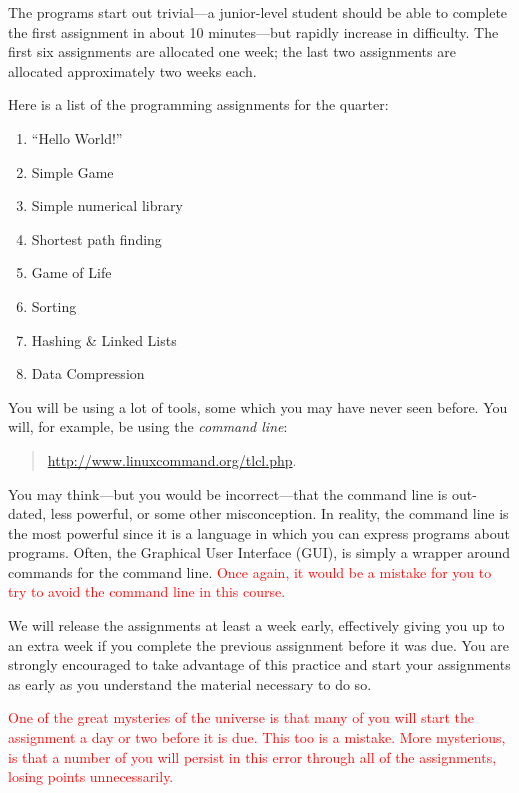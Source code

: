 \documentclass{article}
\begin{document}
The programs start out trivial---a junior-level student should be able to
complete the first assignment in about 10 minutes---but rapidly increase in
difficulty. The first six assignments are allocated one week; the last two
assignments are allocated approximately two weeks each.

Here is a list of the programming assignments for the quarter:
\begin{multicols}{2}
\begin{enumerate}[start=0]
  \item ``Hello World!''
  \item Simple Game
  \item Simple numerical library
  \item Shortest path finding
  \item Game of Life
  \item Sorting
  \item Hashing \& Linked Lists
  \item Data Compression
\end{enumerate}
\end{multicols}

You will be using a lot of tools, some which you may have never seen before. You
will, for example, be using the \emph{command line}:
\begin{quotation}
\centerline{\url{http://www.linuxcommand.org/tlcl.php}.}
\end{quotation}
You may think---but you would be incorrect---that the command line is out-dated,
less powerful, or some other misconception. In reality, the command line is the
most powerful since it is a language in which you can express programs about
programs. Often, the Graphical User Interface (GUI), is simply a wrapper around
commands for the command line. \textcolor{red}{Once again, it would be a
mistake for you to try to avoid the command line in this course.}

We will release the assignments at least a week early, effectively giving you up
to an extra week if you complete the previous assignment before it was due. You
are strongly encouraged to take advantage of this practice and start your
assignments as early as you understand the material necessary to do so.

\textcolor{red}{One of the great mysteries of the universe is that many of you
will start the assignment a day or two before it is due. This too is a mistake.
More mysterious, is that a number of you will persist in this error through all
of the assignments, losing points unnecessarily.}
\end{document}
